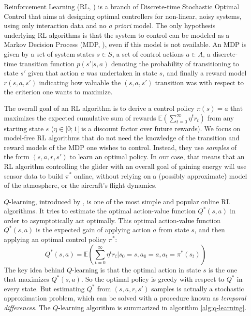 \documentclass{ifacconf}
\begin{document}
Reinforcement Learning (RL, \cite{sutton_book}) is a branch of Discrete-time Stochastic Optimal Control that aims at designing optimal controllers for non-linear, noisy systems, using only interaction data and no \emph{a priori} model. The only hypothesis underlying RL algorithms is that the system to control can be modeled as a Markov Decision Process (MDP, \cite{puterman}), even if this model is not available. An MDP is given by a set of system states $s\in S$, a set of control actions $a\in A$, a discrete-time transition function $p(s'|s,a)$ denoting the probability of transitioning to state $s'$ given that action $a$ was undertaken in state $s$, and finally a reward model $r(s,a,s')$ indicating how valuable the $(s,a,s')$ transition was with respect to the criterion one wants to maximize.

The overall goal of an RL algorithm is to derive a control policy $\pi(s) = a$ that maximizes the expected cumulative sum of rewards $\mathbb{E}\left(\sum\limits_{t=0}^\infty \eta^t r_t\right)$ from any starting state $s$ ($\eta\in[0;1[$ is a discount factor over future rewards). We focus on model-free RL algorithms that do not need the knowledge of the transition and reward models of the MDP one wishes to control. Instead, they use \emph{samples} of the form $(s,a,r,s')$ to learn an optimal policy. In our case, that means that an RL algorithm controlling the glider with an overall goal of gaining energy will use sensor data to build $\pi^*$ online, without relying on a (possibly approximate) model of the atmosphere, or the aircraft's flight dynamics.

$Q$-learning, introduced by \cite{watkins92qlearning}, is one of the most simple and popular online RL algorithms. It tries to estimate the optimal action-value function $Q^*(s,a)$ in order to asymptotically act optimally. This optimal action-value function $Q^*(s,a)$ is the expected gain of applying action $a$ from state $s$, and then applying an optimal control policy $\pi^*$:
\begin{equation*}
Q^*(s,a) = \mathbb{E}\left(\sum\limits_{t=0}^\infty \eta^t r_t | s_0=s, a_0=a, a_t=\pi^*(s_t)\right)
\end{equation*}
The key idea behind $Q$-learning is that the optimal action in state $s$ is the one that maximizes $Q^*(s,a)$. So the optimal policy is greedy with respect to $Q^*$ in every state. But estimating $Q^*$ from $\left(s,a,r,s'\right)$ samples is actually a stochastic approximation problem, which can be solved with a procedure known as \emph{temporal differences}. The $Q$-learning algorithm is summarized in algorithm \ref{alg:q-learning}.
\end{document}
